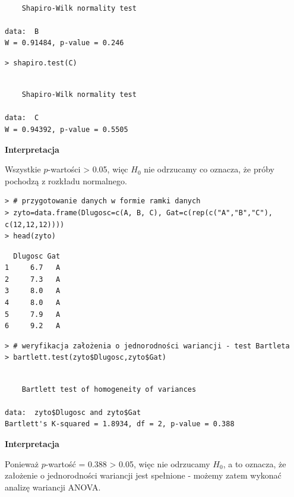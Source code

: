 \documentclass[12pt,B5paper,]{book}
\begin{document}
\begin{verbatim}

    Shapiro-Wilk normality test

data:  B
W = 0.91484, p-value = 0.246
\end{verbatim}

\begin{verbatim}
> shapiro.test(C)
\end{verbatim}

\begin{verbatim}

    Shapiro-Wilk normality test

data:  C
W = 0.94392, p-value = 0.5505
\end{verbatim}

\vspace{0.8cm}

\textbf{Interpretacja}

Wszystkie \(p\)-wartości \textgreater{} 0.05, więc \(H_0\) nie odrzucamy
co oznacza, że próby pochodzą z rozkładu normalnego.

\begin{verbatim}
> # przygotowanie danych w formie ramki danych
> zyto=data.frame(Dlugosc=c(A, B, C), Gat=c(rep(c("A","B","C"), c(12,12,12))))
> head(zyto)
\end{verbatim}

\begin{verbatim}
  Dlugosc Gat
1     6.7   A
2     7.3   A
3     8.0   A
4     8.0   A
5     7.9   A
6     9.2   A
\end{verbatim}

\begin{verbatim}
> # weryfikacja założenia o jednorodności wariancji - test Bartleta
> bartlett.test(zyto$Dlugosc,zyto$Gat)
\end{verbatim}

\begin{verbatim}

    Bartlett test of homogeneity of variances

data:  zyto$Dlugosc and zyto$Gat
Bartlett's K-squared = 1.8934, df = 2, p-value = 0.388
\end{verbatim}

\vspace{0.8cm} \textbf{Interpretacja}

Ponieważ \(p\)-wartość = 0.388 \textgreater{} 0.05, więc nie odrzucamy
\(H_0\), a to oznacza, że założenie o jednorodności wariancji jest
spełnione - możemy zatem wykonać analizę wariancji ANOVA.
\end{document}
